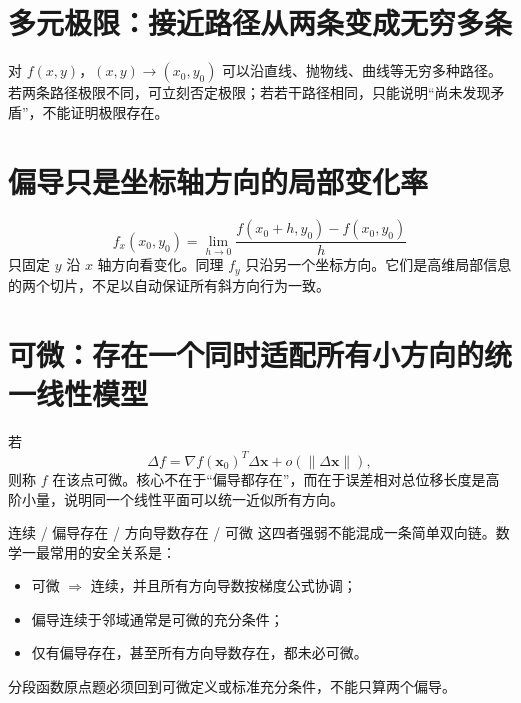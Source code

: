 \documentclass[11pt,a4paper,openany]{ctexbook}
\begin{document}
\section{多元极限：接近路径从两条变成无穷多条}
对 $f(x,y)$，$(x,y)\to(x_0,y_0)$ 可以沿直线、抛物线、曲线等无穷多种路径。若两条路径极限不同，可立刻否定极限；若若干路径相同，只能说明“尚未发现矛盾”，不能证明极限存在。

\section{偏导只是坐标轴方向的局部变化率}
\[
f_x(x_0,y_0)=\lim_{h\to0}\frac{f(x_0+h,y_0)-f(x_0,y_0)}{h}
\]
只固定 $y$ 沿 $x$ 轴方向看变化。同理 $f_y$ 只沿另一个坐标方向。它们是高维局部信息的两个切片，不足以自动保证所有斜方向行为一致。

\section{可微：存在一个同时适配所有小方向的统一线性模型}
若
\[
\Delta f=\nabla f(\bm x_0)^T\Delta\bm x+o(\|\Delta\bm x\|),
\]
则称 $f$ 在该点可微。核心不在于“偏导都存在”，而在于误差相对总位移长度是高阶小量，说明同一个线性平面可以统一近似所有方向。

\begin{boundarybox}{连续 / 偏导存在 / 方向导数存在 / 可微}
这四者强弱不能混成一条简单双向链。数学一最常用的安全关系是：
\begin{itemize}
  \item 可微 $\Rightarrow$ 连续，并且所有方向导数按梯度公式协调；
  \item 偏导连续于邻域通常是可微的充分条件；
  \item 仅有偏导存在，甚至所有方向导数存在，都未必可微。
\end{itemize}
分段函数原点题必须回到可微定义或标准充分条件，不能只算两个偏导。
\end{boundarybox}
\end{document}
